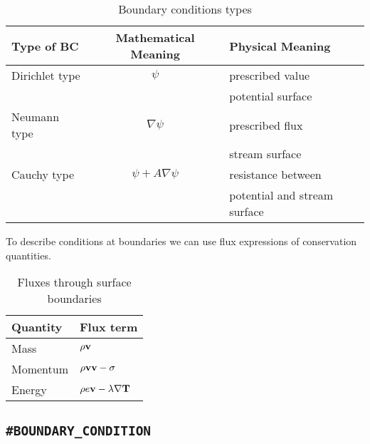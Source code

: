 {\begin{table}[htb!]
\caption{Boundary conditions types}
\begin{center}
\begin{tabular}{|l|c|l|}
\hline
Type of BC & Mathematical Meaning & Physical Meaning \\
\hline \hline
Dirichlet type  & $\psi$               & prescribed value \\
                &                      & potential surface \\
\hline
Neumann type    & $\nabla\psi$         & prescribed flux \\
                &                      & stream surface \\
\hline
Cauchy type     & $\psi+A\nabla\psi$   & resistance between  \\
                &                      & potential and stream surface \\
\hline
\end{tabular}
\end{center}
\end{table}
  

To describe conditions at boundaries we can use flux expressions
of conservation quantities.

\begin{table}[htb!]
\caption{Fluxes through surface boundaries}
\begin{center}
\begin{tabular}{|l|l|}
\hline
Quantity & Flux term \\
\hline \hline
Mass &   $\rho\bf v$ \\
\hline
Momentum & $\rho{\bf vv}-\sigma$ \\
\hline
Energy   & $\rho e\bf v - \lambda\nabla T$ \\
\hline
\end{tabular}
\end{center}
\end{table}

}

\subsection{\texttt{\bf\#BOUNDARY\_CONDITION}}
\label{sec:bc}

